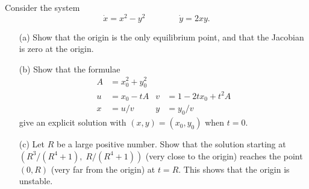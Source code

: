 \documentclass[a4paper]{amsart}
\begin{document}
\begin{exercise}\label{ex-complex-square-b}
 Consider the system
 \[ \dot{x} = x^2-y^2 \hspace{4em} \dot{y} = 2xy. \]
 \begin{itemize}
  \item[(a)] Show that the origin is the only equilibrium point, and
   that the Jacobian is zero at the origin.
  \item[(b)] Show that the formulae
   \begin{align*}
    A &= x_0^2 + y_0^2 \\
    u &= x_0 - tA & v &= 1 - 2tx_0 + t^2A \\
    x &= u/v & y &= y_0/v
   \end{align*}
   give an explicit solution with $(x,y)=(x_0,y_0)$ when $t=0$.
  \item[(c)] Let $R$ be a large positive number.  Show that the
   solution starting at $(R^3/(R^4+1),\;R/(R^4+1))$ (very close to the
   origin) reaches the point $(0,R)$ (very far from the origin) at
   $t=R$.  This shows that the origin is unstable.
 \end{itemize}
\end{exercise}
\end{document}
